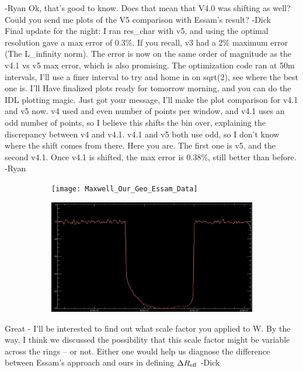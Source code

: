 \documentclass[crop=false,class=article,oneside]{standalone}
\begin{document}
-Ryan
Ok, that's good to know. Does that mean that V4.0 was shifting as well? Could you send me plots of the V5 comparison with Essam's result? -Dick\\
Final update for the night: I ran res\_char with v5, and using the optimal resolution gave a max error of 0.3\%. If you recall, v3 had a 2\% maximum error (The L\_infinity norm). The error is now on the same order of magnitude as the v4.1 vs v5 max error, which is also promising. The optimization code ran at 50m intervals, I'll use a finer interval to try and home in on sqrt(2), see where the best one is. I'll Have finalized plots ready for tomorrow morning, and you can do the IDL plotting magic. Just got your message, I'll make the plot comparison for v4.1 and v5 now. v4 used and even number of points per window, and v4.1 uses an odd number of points, so I believe this shifts the bin over, explaining the discrepancy between v4 and v4.1. v4.1 and v5 both use odd, so I don't know where the shift comes from there. Here you are. The first one is v5, and the second v4.1. Once v4.1 is shifted, the max error is 0.38\%, still better than before. -Ryan
\begin{figure}[H]
    \centering
    \begin{subfigure}[b]{0.49\textwidth}
        \texttt{[image: Maxwell\_Our\_Geo\_Essam\_Data]}
    \end{subfigure}
    \begin{subfigure}[b]{0.49\textwidth}
        \includegraphics[width=\textwidth]{images/Maxwell_v4_1.png}
    \end{subfigure}
\end{figure}
Great - I'll be interested to find out what scale factor you applied to W. By the way, I think we discussed the possibility that this scale factor might be variable across the rings -- or not. Either one would help us diagnose the difference between Essam's approach and ours in defining $\Delta R_{\rm eff}$ -Dick
\end{document}

